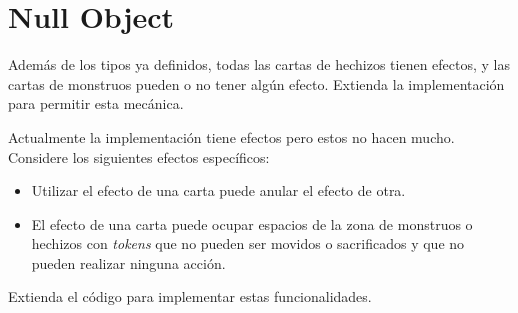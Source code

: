 \section{Null Object}
  \begin{Exercise}[title={Efectos}, label={ex:null-1}, difficulty=1]
    Además de los tipos ya definidos, todas las cartas de hechizos tienen efectos, y las 
    cartas de monstruos pueden o no tener algún efecto.
    Extienda la implementación para permitir esta mecánica.
  \end{Exercise}

  \begin{Exercise}[
      title={Efectos específicos (Propuesto)}, 
      label={ex:null-2}, 
      difficulty=3
    ]
    Actualmente la implementación tiene efectos pero estos no hacen mucho.
    Considere los siguientes efectos específicos:
    \begin{itemize}
      \item Utilizar el efecto de una carta puede anular el efecto de otra.
      \item El efecto de una carta puede ocupar espacios de la zona de monstruos o 
        hechizos con \textit{tokens} que no pueden ser movidos o sacrificados y que no 
        pueden realizar ninguna acción.
    \end{itemize}

    Extienda el código para implementar estas funcionalidades.
  \end{Exercise}
%